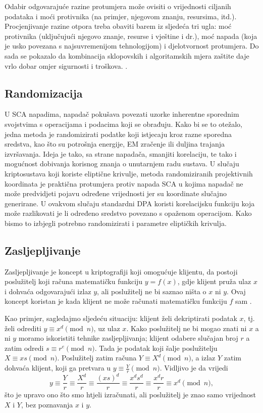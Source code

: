 \documentclass[times, utf8, diplomski]{fer}
\begin{document}
Odabir odgovarajuće razine protumjera može ovisiti o vrijednosti ciljanih podataka i moći protivnika (na primjer, njegovom znanju, resursima, itd.). Procjenjivanje razine otpora treba obaviti barem iz sljedeća tri ugla: moć protivnika (uključujući njegovo znanje, resurse i vještine i dr.), moć napada (koja je usko povezana s najsuvremenijom tehnologijom) i djelotvornost protumjera. Do sada se pokazalo da kombinacija sklopovskih i algoritamskih mjera zaštite daje vrlo dobar omjer sigurnosti i troškova. \citep{zhou2005side}.

\subsection{Randomizacija}

U SCA napadima, napadač pokušava povezati uzorke inherentne sporednim svojstvima s operacijama i podacima koji se obrađuju. Kako bi se to otežalo, jedna metoda je randomizirati podatke koji istjecaju kroz razne sporedna sredstva, kao što su potrošnja energije, EM zračenje ili duljina trajanja izvršavanja. Ideja je tako, sa strane napadača, smanjiti korelaciju, te tako i mogućnost dobivanja korisnog znanja o unutarnjem radu sustava.
U slučaju kriptosustava koji koriste eliptične krivulje, metoda randomiziranih projektivnih koordinata je praktična protumjera protiv napada SCA u kojima napadač ne može predvidjeti pojavu određene vrijednosti jer su koordinate slučajno generirane. U ovakvom slučaju standardni DPA koristi korelacijsku funkciju koja može razlikovati je li određeno sredstvo povezano s opaženom operacijom. Kako bismo to izbjegli potrebno randomizirati i parametre eliptičkih krivulja.

\subsection{Zasljepljivanje}

Zasljepljivanje je koncept u kriptografiji koji omogućuje klijentu, da postoji poslužitelj koji računa matematičku funkciju \(y = f(x)\), gdje klijent pruža ulaz \(x\) i dohvaća odgovarajući izlaz \(y\), ali poslužitelj ne bi saznao ništa o \(x\) ni \(y\). Ovaj koncept koristan je kada klijent ne može računati matematičku funkciju \(f\) sam \citep{Bleumer2011}.

Kao primjer, sagledajmo sljedeću situaciju: klijent želi dekriptirati podatak \(x\), tj. želi odrediti \(y \equiv x^d \pmod{n}\), uz ulaz \(x\). Kako poslužitelj ne bi mogao znati ni \(x\) a ni \(y\) moramo iskoristiti tehnike zasljepljivanja; klijent odabere slučajan broj \(r\) a zatim odredi \(s \equiv r^e \pmod{n} \). Tada je podatak koji šalje poslužitelju \( X \equiv xs \pmod{n}\). Poslužitelj zatim računa \(Y \equiv X^d \pmod{n}\), a izlaz \(Y\) zatim dohvaća klijent, koji ga pretvara u \(y \equiv \frac{Y}{r} \pmod{n}\). Vidljivo je da vrijedi
\begin{equation}
    y \equiv
    \frac{Y}{r} \equiv
    \frac{X^d}{r} \equiv
    \frac{(xs)^d}{r} \equiv
    \frac{x^d s^d}{r} \equiv
    \frac{x^d r}{r} \equiv
    x^d \pmod{n},
\end{equation}
što je upravo ono što smo htjeli izračunati, ali poslužitelj je znao samo vrijednost \(X\) i \(Y\), bez poznavanja \(x\) i \(y\).
\end{document}
